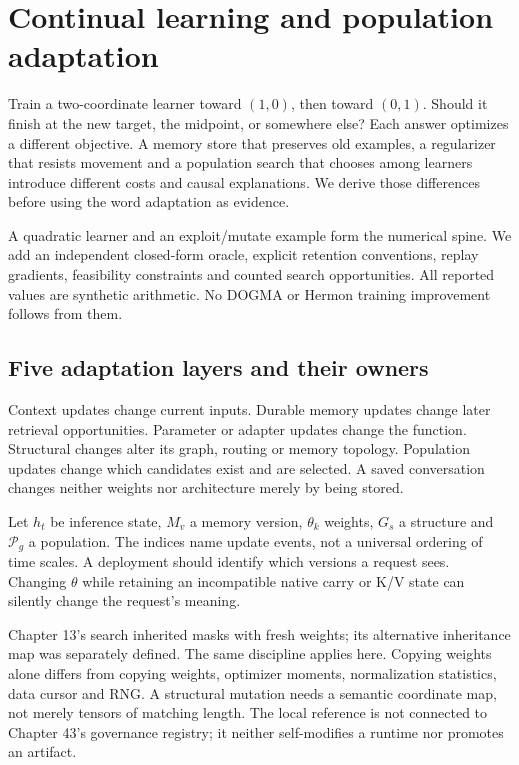 \chapter{Continual learning and population adaptation}
\label{evod50:chapter}
Train a two-coordinate learner toward $(1,0)$, then toward $(0,1)$.
Should it finish at the new target, the midpoint, or somewhere else? Each
answer optimizes a different objective. A memory store that preserves old
examples, a regularizer that resists movement and a population search that
chooses among learners introduce different costs and causal explanations.
We derive those differences before using the word adaptation as evidence.

A quadratic learner and an exploit/mutate example form the numerical spine. We add
an independent closed-form oracle, explicit retention conventions,
replay gradients, feasibility constraints and counted search opportunities.
All reported values are synthetic arithmetic. No DOGMA or Hermon training
improvement follows from them.

\section{Five adaptation layers and their owners}
Context updates change current inputs. Durable memory updates change later
retrieval opportunities. Parameter or adapter updates change the function.
Structural changes alter its graph, routing or memory topology. Population
updates change which candidates exist and are selected. A saved conversation
changes neither weights nor architecture merely by being stored.

Let $h_t$ be inference state, $M_v$ a memory version, $\theta_k$ weights,
$G_s$ a structure and $\mathcal P_g$ a population. The indices name update
events, not a universal ordering of time scales. A deployment should identify
which versions a request sees. Changing $\theta$ while retaining an incompatible
native carry or K/V state can silently change the request's meaning.

Chapter 13's search inherited masks with fresh weights; its alternative
inheritance map was separately defined. The same discipline applies here.
Copying weights alone differs from copying weights, optimizer moments,
normalization statistics, data cursor and RNG. A structural mutation needs
a semantic coordinate map, not merely tensors of matching length. The local
reference is not connected to Chapter 43's governance registry; it neither
self-modifies a runtime nor promotes an artifact.

